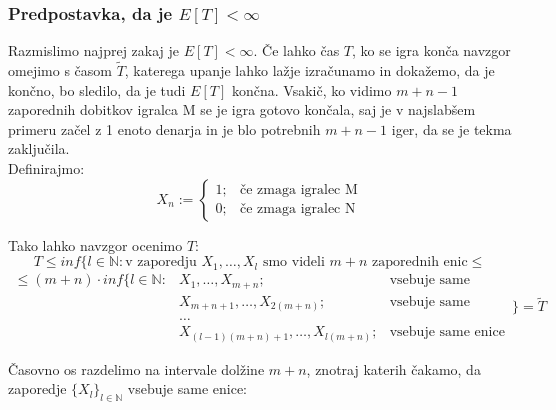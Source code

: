 \documentclass[12pt, a4paper]{article}
\begin{document}
\subsubsection{Predpostavka, da je $E[T] < \infty$}
Razmislimo najprej zakaj je $E[T] <\infty$. Če lahko čas $T$, ko se igra konča navzgor omejimo s časom $\widetilde{T}$, katerega upanje lahko lažje izračunamo in dokažemo, da je končno, bo sledilo, da je tudi $E[T]$ končna. Vsakič, ko vidimo $m+n-1$ zaporednih dobitkov igralca M se je igra gotovo končala, saj je v najslabšem primeru začel z 1 enoto denarja in je blo potrebnih $m+n-1$ iger, da se je tekma zaključila.\\

Definirajmo: 
\[
X_n := \left\{
\begin{array}{rl}
1; & \textrm{če zmaga igralec M}\\
0; & \textrm{če zmaga igralec N}
\end{array}
\right.
\]

Tako lahko navzgor ocenimo $T$:
$$T \leq inf\{ l \in \mathbb{N}: \textrm{v zaporedju } X_1, \dots, X_l \textrm{ smo videli } m+n \textrm{ zaporednih enic} \leq$$ 
$$
\begin{array} {lll} 
\leq (m+n)\cdot inf\{ l \in \mathbb{N}:& X_1, \dots, X_{m+n}; & \textrm{vsebuje same enice, ali} \\ 
&X_{m+n+1}, \dots, X_{2(m+n)};& \textrm{vsebuje same enice, ali}\\
&\dots \\
&X_{(l-1)(m+n)+1}, \dots, X_{l(m+n)}; & \textrm{vsebuje same enice}
\end{array} \Bigg\} = \widetilde{T}$$

Časovno os razdelimo na intervale dolžine $m+n$, znotraj katerih čakamo, da zaporedje $\{X_l\}_{l \in \mathbb{N}}$ vsebuje same enice:
\begin{center}
\end{center}
\end{document}
